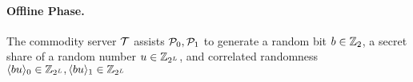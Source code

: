

\paragraph{Offline Phase.}
The commodity server $\tt$ assists $\pp_0, \pp_1$ to generate a random bit $b\in\Zbb_{2}$, a secret share of a random number $u\in\Zbb_{2^L}$, and correlated randomness $\l bu \r_0 \in \Zbb_{2^L}, \l bu \r_1 \in \Zbb_{2^L}$

\iffalse
correlated randomness $h, \l h\r_0, \l h\r_1\in\Zbb_2$ and $b, \l b \r_0, \l b \r_1,u , \l u \r_0, \l u \r_1\in\Zbb_{2^\bitlen}$ such that
$u=hb,h =\ l h\r_0 + \l h\r_1, b =\ l b\r_0 + \l b\r_1, u = \l u\r_0 + \l u\r_1$.
These randomnesses can be realized by 1) generating the random $\l u\r_0, \l h\r_0, \l h\r_1, \l b\r_0, \l b\r_1$, 2) computing $u=hb$, and 3) splitting $u$ to $\l u\r_0, \l u\r_1$.
\fi

